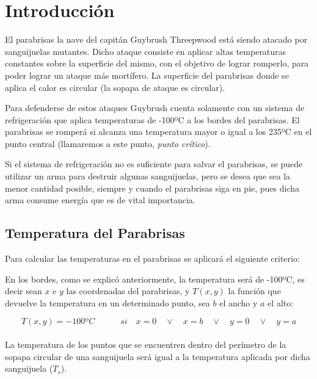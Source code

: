 \documentclass{article}
\begin{document}
\section{Introducción}

El parabrisas la nave del capitán Guybrush Threepwood está siendo atacado por sanguijuelas mutantes. Dicho ataque consiste en aplicar altas temperaturas constantes sobre la superficie del mismo, con el objetivo de lograr romperlo, para poder lograr un ataque más mortífero. La superficie del parabrisas donde se aplica el calor es circular (la sopapa de ataque es circular).

Para defenderse de estos ataques Guybrush cuenta solamente con un sistema de refrigeración que aplica temperaturas de -100ºC a los bordes del parabrisas. El parabrisas se romperá si alcanza una temperatura mayor o igual a los 235ºC en el punto central (llamaremos a este punto, \textit{punto crítico}).

Si el sistema de refrigeración no es suficiente para salvar el parabrisas, se puede utilizar un arma para destruir algunas sanguijuelas, pero se desea que sea la menor cantidad posible, siempre y cuando el parabrisas siga en pie, pues dicha arma consume energía que es de vital importancia.







\subsection{Temperatura del Parabrisas}

Para calcular las temperaturas en el parabrisas se aplicará el siguiente criterio: 

En los bordes, como se explicó anteriormente, la temperatura será de -100ºC, es decir sean $x$ e $y$ las coordenadas del parabrisas, y $T(x,y)$ la función que devuelve la temperatura en un determinado punto, sea $b$ el ancho y $a$ el alto:

\begin{equation}
T(x,y)=-100ºC 	\quad	\quad	 \quad si \quad x=0 \quad \vee \quad x=b \quad \vee \quad y=0 \quad \vee \quad y=a
\end{equation}\\



La temperatura de los puntos que se encuentren dentro del perímetro de la sopapa circular de una sanguijuela será igual a la temperatura aplicada por dicha sanguijuela ($T_s$).\\
\end{document}
